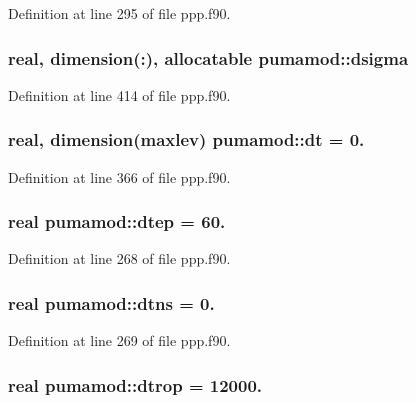 \-Definition at line 295 of file ppp.\-f90.

\hypertarget{classpumamod_a11d50c855ac5c212c04a3640ddfa362d}{
\subsubsection[{dsigma}]{\setlength{\rightskip}{0pt plus 5cm}real, dimension(\-:), allocatable {\bf pumamod\-::dsigma}}}
\label{classpumamod_a11d50c855ac5c212c04a3640ddfa362d}


\-Definition at line 414 of file ppp.\-f90.

\hypertarget{classpumamod_ad1899f0a731ed4ab715422d9fd8d444b}{
\subsubsection[{dt}]{\setlength{\rightskip}{0pt plus 5cm}real, dimension(maxlev) {\bf pumamod\-::dt} = 0.}}
\label{classpumamod_ad1899f0a731ed4ab715422d9fd8d444b}


\-Definition at line 366 of file ppp.\-f90.

\hypertarget{classpumamod_ae1160d24a7abdc97bc3389044621d3d7}{
\subsubsection[{dtep}]{\setlength{\rightskip}{0pt plus 5cm}real {\bf pumamod\-::dtep} = 60.}}
\label{classpumamod_ae1160d24a7abdc97bc3389044621d3d7}


\-Definition at line 268 of file ppp.\-f90.

\hypertarget{classpumamod_a9f9ff76b20700deda41db8834db4b3c3}{
\subsubsection[{dtns}]{\setlength{\rightskip}{0pt plus 5cm}real {\bf pumamod\-::dtns} = 0.}}
\label{classpumamod_a9f9ff76b20700deda41db8834db4b3c3}


\-Definition at line 269 of file ppp.\-f90.

\hypertarget{classpumamod_a58d401b03b69eccd92e7864d3d821c4c}{
\subsubsection[{dtrop}]{\setlength{\rightskip}{0pt plus 5cm}real {\bf pumamod\-::dtrop} = 12000.}}
\label{classpumamod_a58d401b03b69eccd92e7864d3d821c4c}


